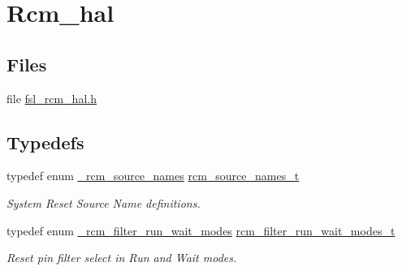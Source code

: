\hypertarget{group__rcm__hal}{}\section{Rcm\+\_\+hal}
\label{group__rcm__hal}
\subsection*{Files}
\begin{DoxyCompactItemize}
\item 
file \hyperlink{fsl__rcm__hal_8h}{fsl\+\_\+rcm\+\_\+hal.\+h}
\end{DoxyCompactItemize}
\subsection*{Typedefs}
\begin{DoxyCompactItemize}
\item 
typedef enum \hyperlink{group__rcm__hal_gafb712d57b425f25cb495aad2e4fb1fbc}{\+\_\+rcm\+\_\+source\+\_\+names} \hyperlink{group__rcm__hal_gaf0d8e1d6126e3bea2f23fe1f32e02433}{rcm\+\_\+source\+\_\+names\+\_\+t}\hypertarget{group__rcm__hal_gaf0d8e1d6126e3bea2f23fe1f32e02433}{}\label{group__rcm__hal_gaf0d8e1d6126e3bea2f23fe1f32e02433}

\begin{DoxyCompactList}\small\item\em System Reset Source Name definitions. \end{DoxyCompactList}\item 
typedef enum \hyperlink{group__rcm__hal_ga5295e3eef3122de8735e6b4aaa64d746}{\+\_\+rcm\+\_\+filter\+\_\+run\+\_\+wait\+\_\+modes} \hyperlink{group__rcm__hal_gac13d38f23c0c615bd719fc340754044c}{rcm\+\_\+filter\+\_\+run\+\_\+wait\+\_\+modes\+\_\+t}\hypertarget{group__rcm__hal_gac13d38f23c0c615bd719fc340754044c}{}\label{group__rcm__hal_gac13d38f23c0c615bd719fc340754044c}

\begin{DoxyCompactList}\small\item\em Reset pin filter select in Run and Wait modes. \end{DoxyCompactList}\end{DoxyCompactItemize}
